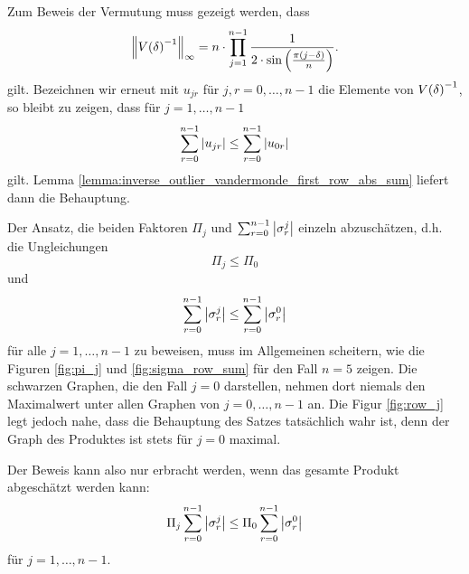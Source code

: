 \begin{remark}
    Zum Beweis der Vermutung muss gezeigt werden, dass
    \[
        \left\lVert V \! \left( \delta \right)^{-1} \right\rVert_\infty
        = n \cdot \prod_{j=1}^{n-1} \frac{1}{2 \cdot \sin \left(\frac{\pi (j - \delta)}{n} \right)}.
    \]
    gilt.
    Bezeichnen wir erneut mit $u_{jr}$ für $j,r = 0, \dots, n-1$ die Elemente von $V \! \left( \delta \right)^{-1}$,
    so bleibt zu zeigen, dass für $j = 1, \dots, n-1$
    \[
        \sum_{r=0}^{n-1} \left\lvert u_{jr} \right\rvert \leq \sum_{r=0}^{n-1} \left\lvert u_{0r} \right\rvert
    \]
    gilt.
    Lemma \ref{lemma:inverse_outlier_vandermonde_first_row_abs_sum} liefert dann die Behauptung.

    \noindent Der Ansatz, die beiden Faktoren $\Pi_j$ und
    $\sum_{r=0}^{n-1} \left\lvert \sigma_r^j \right\rvert$ einzeln abzuschätzen,
    d.h. die Ungleichungen
    \[
        \Pi_j \leq \Pi_0
    \]
    und
    \[
        \sum_{r=0}^{n-1} \left\lvert \sigma_r^j \right\rvert \leq \sum_{r=0}^{n-1} \left\lvert \sigma_r^0 \right\rvert
    \]
    für alle $ j=1, \dots, n-1$ zu beweisen, muss im Allgemeinen scheitern, wie
    die Figuren \ref{fig:pi_j} und \ref{fig:sigma_row_sum} für den Fall $n=5$ zeigen.
    Die schwarzen Graphen, die den Fall $j=0$ darstellen, nehmen dort niemals
    den Maximalwert unter allen Graphen von $j=0, \dots, n-1$ an.
    Die Figur \ref{fig:row_j} legt jedoch nahe, dass die Behauptung des
    Satzes tatsächlich wahr ist, denn der Graph des Produktes ist stets für
    $j=0$ maximal.

    \noindent Der Beweis kann also nur erbracht werden, wenn das gesamte Produkt
    abgeschätzt werden kann:
    \[
        \Pi_j \sum_{r=0}^{n-1} \left\lvert \sigma_r^j \right\rvert \leq \Pi_0 \sum_{r=0}^{n-1} \left\lvert \sigma_r^0 \right\rvert
    \]
    für $j=1, \dots, n-1$.
\end{remark}

%
%

